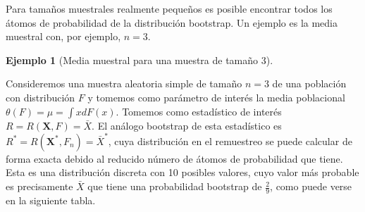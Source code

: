\documentclass[
]{book}
\theoremstyle{break}
\theoremstyle{definition}
\theoremstyle{definition}
\newtheorem{example}{Ejemplo}[chapter]
\theoremstyle{definition}
\theoremstyle{definition}
\theoremstyle{remark}
\begin{document}
Para tamaños muestrales realmente pequeños es posible encontrar todos
los átomos de probabilidad de la distribución bootstrap. Un ejemplo es
la media muestral con, por ejemplo, \(n=3\).

\begin{example}[Media muestral para una muestra de tamaño 3]
\protect\hypertarget{exm:media3}{}{\label{exm:media3} \iffalse (Media muestral para una muestra de tamaño 3) \fi{} } \vspace{0.5cm}

Consideremos una muestra aleatoria simple de tamaño \(n=3\) de una
población con distribución \(F\) y tomemos como parámetro de interés la
media poblacional
\(\theta \left( F \right) =\mu =\int xdF\left( x \right)\).
Tomemos como estadístico de interés
\(R=R\left( \mathbf{X},F \right) =\bar{X}\).
El análogo bootstrap de esta estadístico es
\(R^{\ast}=R\left( \mathbf{X}^{\ast},F_n \right) =\bar{X}^{\ast}\),
cuya distribución en el remuestreo se puede calcular de forma exacta
debido al reducido número de átomos de probabilidad que tiene.
Esta es una distribución discreta con 10 posibles valores, cuyo
valor más probable es precisamente \(\bar{X}\) que tiene una
probabilidad bootstrap de \(\frac{2}{9}\), como puede verse en la
siguiente tabla.


\end{example}
\end{document}
